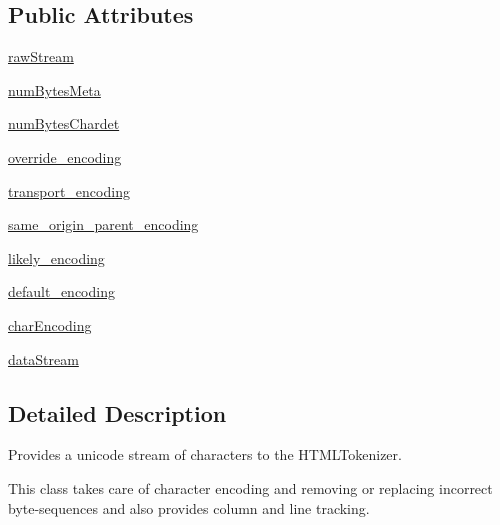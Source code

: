 \subsection*{Public Attributes}
\begin{DoxyCompactItemize}
\item 
\hyperlink{classpip_1_1__vendor_1_1html5lib_1_1__inputstream_1_1HTMLBinaryInputStream_a77adcc3a677843fdfb3dc30db1870dbf}{raw\+Stream}
\item 
\hyperlink{classpip_1_1__vendor_1_1html5lib_1_1__inputstream_1_1HTMLBinaryInputStream_abf2c66483476815b6c96091c4b70285e}{num\+Bytes\+Meta}
\item 
\hyperlink{classpip_1_1__vendor_1_1html5lib_1_1__inputstream_1_1HTMLBinaryInputStream_a039332af389374ad16ef4b84bc4c2031}{num\+Bytes\+Chardet}
\item 
\hyperlink{classpip_1_1__vendor_1_1html5lib_1_1__inputstream_1_1HTMLBinaryInputStream_a60ee6331ccd6570a00190afe2f8501e9}{override\+\_\+encoding}
\item 
\hyperlink{classpip_1_1__vendor_1_1html5lib_1_1__inputstream_1_1HTMLBinaryInputStream_a52bfb43a6ec6db715b0875cbad0900e8}{transport\+\_\+encoding}
\item 
\hyperlink{classpip_1_1__vendor_1_1html5lib_1_1__inputstream_1_1HTMLBinaryInputStream_a1d13eb92e337232831198e804406ddb4}{same\+\_\+origin\+\_\+parent\+\_\+encoding}
\item 
\hyperlink{classpip_1_1__vendor_1_1html5lib_1_1__inputstream_1_1HTMLBinaryInputStream_a9b1dfdeda3522560f32c80bfbe7fc0e4}{likely\+\_\+encoding}
\item 
\hyperlink{classpip_1_1__vendor_1_1html5lib_1_1__inputstream_1_1HTMLBinaryInputStream_aeeefce990096c892218391afaf488d82}{default\+\_\+encoding}
\item 
\hyperlink{classpip_1_1__vendor_1_1html5lib_1_1__inputstream_1_1HTMLBinaryInputStream_a67406f92d94f2ef93485af7633fc7d8d}{char\+Encoding}
\item 
\hyperlink{classpip_1_1__vendor_1_1html5lib_1_1__inputstream_1_1HTMLBinaryInputStream_aebe1d00da9e252e4a173823ba8b112e0}{data\+Stream}
\end{DoxyCompactItemize}


\subsection{Detailed Description}
\begin{DoxyVerb}Provides a unicode stream of characters to the HTMLTokenizer.

This class takes care of character encoding and removing or replacing
incorrect byte-sequences and also provides column and line tracking.\end{DoxyVerb}
 

